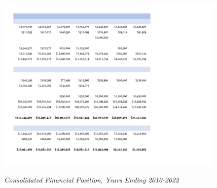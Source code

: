 \begin{figure}[hbt]
    \caption[Consolidated Financial Position, Years Ending 2010–2022]{\textit{Consolidated Financial Position, Years Ending 2010-2022}}\label{fig:consolidated_financial_position_2010-2022-4} %
    \includegraphics[width=\textwidth]{Consolidated Financial Statements/v5 Spreadsheets/Consolidated_Financial_Position_Years_2010-2022 PDF pages/.pg_0004}\\ %
\end{figure}

